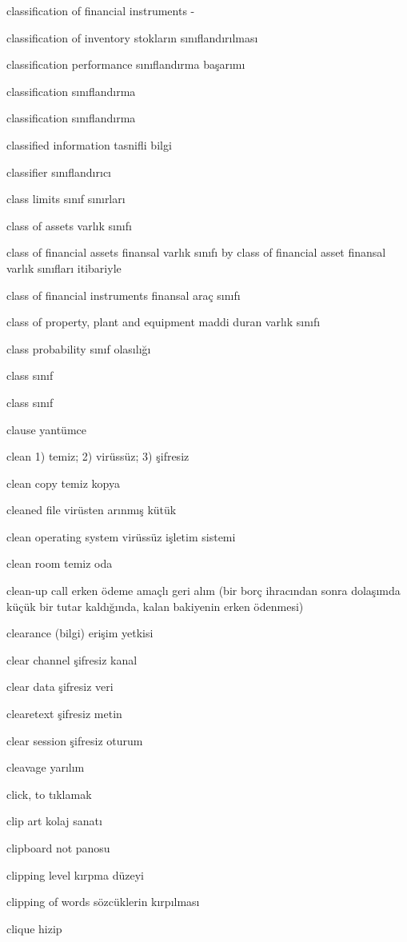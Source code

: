 \documentclass[12pt,fleqn]{article}\usepackage{../../common}
\begin{document}
classification of financial instruments -

classification of inventory stokların sınıflandırılması

classification performance sınıflandırma başarımı

classification sınıflandırma

classification sınıflandırma

classified information tasnifli bilgi

classifier sınıflandırıcı

class limits sınıf sınırları

class of assets varlık sınıfı

class of financial assets finansal varlık sınıfı by class of financial asset finansal varlık sınıfları itibariyle

class of financial instruments finansal araç sınıfı

class of property, plant and equipment maddi duran varlık sınıfı

class probability sınıf olasılığı

class sınıf

class sınıf

clause yantümce

clean 1) temiz; 2) virüssüz; 3) şifresiz

clean copy temiz kopya

cleaned file virüsten arınmış kütük

clean operating system virüssüz işletim sistemi

clean room temiz oda

clean-up call erken ödeme amaçlı geri alım (bir borç ihracından sonra dolaşımda küçük bir tutar kaldığında, kalan bakiyenin erken ödenmesi)

clearance (bilgi) erişim yetkisi

clear channel şifresiz kanal

clear data şifresiz veri

clearetext şifresiz metin

clear session şifresiz oturum

cleavage yarılım

click, to tıklamak

clip art kolaj sanatı

clipboard not panosu

clipping level kırpma düzeyi

clipping of words sözcüklerin kırpılması

clique hizip
\end{document}
